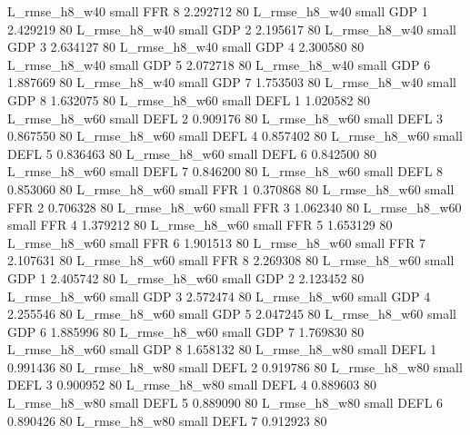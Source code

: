  L_rmse_h8_w40      small      FFR                 8 2.292712 80
 L_rmse_h8_w40      small      GDP                 1 2.429219 80
 L_rmse_h8_w40      small      GDP                 2 2.195617 80
 L_rmse_h8_w40      small      GDP                 3 2.634127 80
 L_rmse_h8_w40      small      GDP                 4 2.300580 80
 L_rmse_h8_w40      small      GDP                 5 2.072718 80
 L_rmse_h8_w40      small      GDP                 6 1.887669 80
 L_rmse_h8_w40      small      GDP                 7 1.753503 80
 L_rmse_h8_w40      small      GDP                 8 1.632075 80
 L_rmse_h8_w60      small     DEFL                 1 1.020582 80
 L_rmse_h8_w60      small     DEFL                 2 0.909176 80
 L_rmse_h8_w60      small     DEFL                 3 0.867550 80
 L_rmse_h8_w60      small     DEFL                 4 0.857402 80
 L_rmse_h8_w60      small     DEFL                 5 0.836463 80
 L_rmse_h8_w60      small     DEFL                 6 0.842500 80
 L_rmse_h8_w60      small     DEFL                 7 0.846200 80
 L_rmse_h8_w60      small     DEFL                 8 0.853060 80
 L_rmse_h8_w60      small      FFR                 1 0.370868 80
 L_rmse_h8_w60      small      FFR                 2 0.706328 80
 L_rmse_h8_w60      small      FFR                 3 1.062340 80
 L_rmse_h8_w60      small      FFR                 4 1.379212 80
 L_rmse_h8_w60      small      FFR                 5 1.653129 80
 L_rmse_h8_w60      small      FFR                 6 1.901513 80
 L_rmse_h8_w60      small      FFR                 7 2.107631 80
 L_rmse_h8_w60      small      FFR                 8 2.269308 80
 L_rmse_h8_w60      small      GDP                 1 2.405742 80
 L_rmse_h8_w60      small      GDP                 2 2.123452 80
 L_rmse_h8_w60      small      GDP                 3 2.572474 80
 L_rmse_h8_w60      small      GDP                 4 2.255546 80
 L_rmse_h8_w60      small      GDP                 5 2.047245 80
 L_rmse_h8_w60      small      GDP                 6 1.885996 80
 L_rmse_h8_w60      small      GDP                 7 1.769830 80
 L_rmse_h8_w60      small      GDP                 8 1.658132 80
 L_rmse_h8_w80      small     DEFL                 1 0.991436 80
 L_rmse_h8_w80      small     DEFL                 2 0.919786 80
 L_rmse_h8_w80      small     DEFL                 3 0.900952 80
 L_rmse_h8_w80      small     DEFL                 4 0.889603 80
 L_rmse_h8_w80      small     DEFL                 5 0.889090 80
 L_rmse_h8_w80      small     DEFL                 6 0.890426 80
 L_rmse_h8_w80      small     DEFL                 7 0.912923 80

